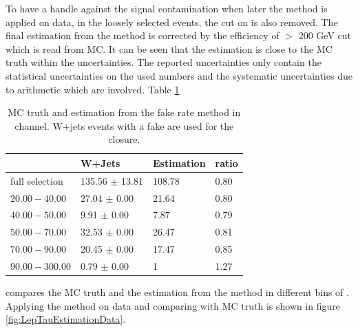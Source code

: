 To have a handle against the signal contamination when later the method is applied 
on data, in the loosely selected events, the cut on \tauMT is also removed. The final estimation from the method is corrected by the efficiency 
of \tauMT $>$ 200 GeV cut which is read from MC. It can be seen that the estimation is close to the MC truth within the uncertainties.
The reported uncertainties only contain the statistical uncertainties on the used numbers and the systematic uncertainties due to arithmetic 
which are involved. Table \ref{tbl:LepTauEstimationClosure}
\begin{table}
\begin{center}
\begin{tabular}{llll}
\hline
\hline
               &  W+Jets& Estimation & ratio\\
\hline
\hline
full selection &  135.56 $\pm$ 13.81 & 108.78    & 0.80 \\
$20.00-40.00$  &  27.04 $\pm$ 0.00   & 21.64     & 0.80 \\
$40.00-50.00$  &  9.91 $\pm$ 0.00    & 7.87      & 0.79 \\
$50.00-70.00$  &  32.53 $\pm$ 0.00   & 26.47     & 0.81 \\
$70.00-90.00$  &  20.45 $\pm$ 0.00   & 17.47     & 0.85 \\
$90.00-300.00$ &  0.79 $\pm$ 0.00    & 1         & 1.27\\
\hline
\hline
\end{tabular}
\caption{MC truth and estimation from the fake rate method in \muTau channel. W+jets events with a fake \Tau are used for the closure.}
\label{tbl:LepTauEstimationClosure}
\end{center}
\end{table}
compares the MC truth and the estimation from the method in different bins of \mttwo. Applying the method on data and comparing with MC truth is 
shown in figure \ref{fig:LepTauEstimationData}.
